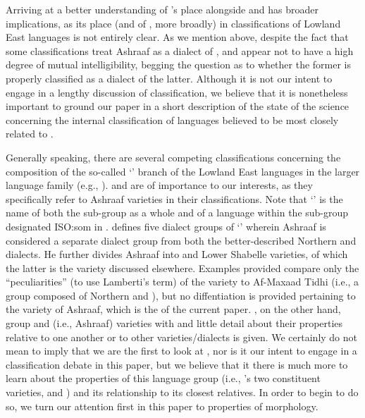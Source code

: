 \documentclass[output=paper,modfonts,nonflat,
colorlinks, citecolor=brown,
draftmode
]{langsci/langscibook}
\begin{document}
 Arriving at a better understanding of 's place alongside  and  has broader implications, as its place (and of , more broadly) in classifications of Lowland East  languages is not entirely clear. As we mention above, despite the fact that some classifications treat Ashraaf as a dialect of ,  and  appear not to have a high degree of mutual intelligibility, begging the question as to whether the former is properly classified as a dialect of the latter. Although it is not our intent to engage in a lengthy discussion of classification, we believe that it is nonetheless important to ground our paper in a short description of the state of the science concerning the internal classification of languages believed to be most closely related to . 
 
 Generally speaking, there are several competing classifications concerning the composition of the so-called `' branch of the Lowland East  languages in the larger  language family (e.g., \citealt{Abdhullahi2000,EhretAli1984,Heine1978,Lamberti1984,Moreno1955}). \citet{Lamberti1984} and \citet{EhretAli1984} are of importance to our interests, as they specifically refer to Ashraaf varieties in their classifications. Note that `' is the name of both the sub-group as a whole and of a language within the sub-group designated ISO:som in \citet{Ethnologue19}. \citet{Lamberti1984} defines five dialect groups of `' wherein Ashraaf is considered a separate dialect group from both the better-described Northern and   dialects. He further divides Ashraaf into  and Lower Shabelle varieties, of which the latter is the  variety discussed elsewhere. Examples provided compare only the ``peculiarities'' (to use Lamberti's term) of the  variety to Af-Maxaad Tidhi (i.e., a group composed of Northern and  ), but no diffentiation is provided pertaining to the  variety of Ashraaf, which is the  of the current paper. \citet{EhretAli1984}, on the other hand, group  and  (i.e., Ashraaf) varieties with   and little detail about their properties relative to one another or to other varieties/dialects is given. We certainly do not mean to imply that we are the first to look at , nor is it our intent to engage in a classification debate in this paper, but we believe that it there is much more to learn about the properties of this language group (i.e., 's two constituent varieties,  and ) and its relationship to its closest relatives. In order to begin to do so, we turn our attention first in this paper to properties of  morphology.
 
\end{document}
